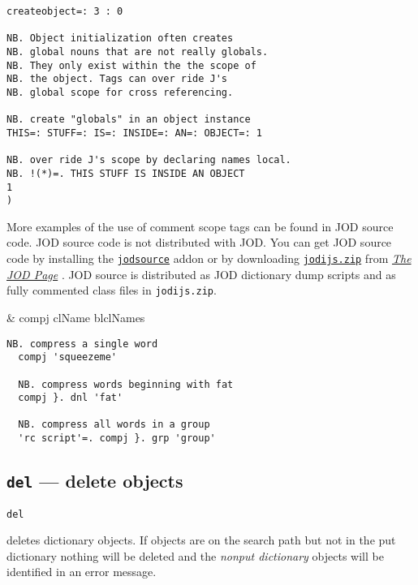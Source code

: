      
\begin{lstlisting}[frame=single,framerule=0pt]    
createobject=: 3 : 0

NB. Object initialization often creates
NB. global nouns that are not really globals.
NB. They only exist within the the scope of
NB. the object. Tags can over ride J's 
NB. global scope for cross referencing.

NB. create "globals" in an object instance
THIS=: STUFF=: IS=: INSIDE=: AN=: OBJECT=: 1

NB. over ride J's scope by declaring names local.
NB. !(*)=. THIS STUFF IS INSIDE AN OBJECT
1
)
\end{lstlisting}

    More examples of the use of comment scope tags can be found in 
      JOD source code.  JOD source code is not 
     distributed with JOD.  You can get JOD source code by installing
     the  \href{http://www.jsoftware.com/jwiki/Addons/general/jodsource}{\texttt{jodsource}}
     addon or by downloading \href{http://bakerjd99.wordpress.com/the-jod-page/}{\texttt{jodijs.zip}} from %
     \href{http://bakerjd99.wordpress.com/the-jod-page/}{\emph{The JOD Page}} \cite{baker:jodpages}.  
     JOD source is distributed as JOD dictionary dump scripts and as fully commented
	 class files in \texttt{jodijs.zip}.

\begin{wordhead}
\monad & compj clName \argsep blclNames \\
\end{wordhead}
\begin{lstlisting}[frame=single,framerule=0pt]
  NB. compress a single word
  compj 'squeezeme'  
  
  NB. compress words beginning with fat
  compj }. dnl 'fat' 

  NB. compress all words in a group 
  'rc script'=. compj }. grp 'group'
\end{lstlisting}

\subsection{\texttt{del} --- delete objects}

\hypertarget{il:del}{\texttt{del}} deletes dictionary objects. 
If objects are on the search path but not
 in the put dictionary nothing will be deleted and 
 the \emph{nonput dictionary} objects will be identified in an error message. 

